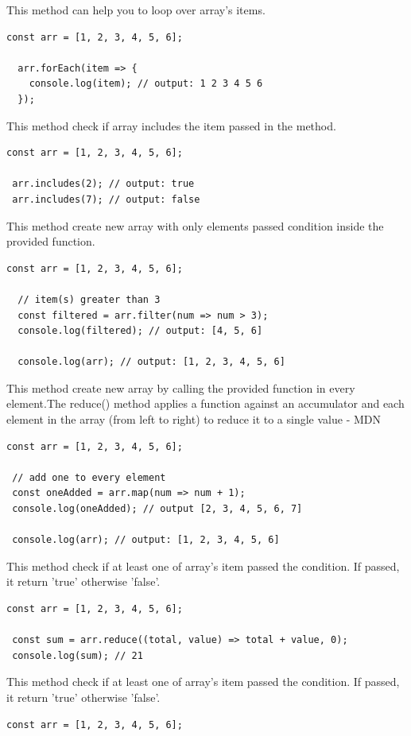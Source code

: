 \documentclass[10pt, a4paper, twocolumn]{article}
\begin{document}
\begin{description}[align=left]
\item [forEach()] This method can help you to loop over array's items.
\begin{lstlisting}
const arr = [1, 2, 3, 4, 5, 6];

  arr.forEach(item => {
    console.log(item); // output: 1 2 3 4 5 6
  });
\end{lstlisting}
\item [includes()] This method check if array includes the item passed in the method.
\begin{lstlisting}
const arr = [1, 2, 3, 4, 5, 6];

 arr.includes(2); // output: true
 arr.includes(7); // output: false
\end{lstlisting}
\item [filter()] This method create new array with only elements passed condition inside the provided function.
\begin{lstlisting}
const arr = [1, 2, 3, 4, 5, 6];

  // item(s) greater than 3
  const filtered = arr.filter(num => num > 3);
  console.log(filtered); // output: [4, 5, 6]

  console.log(arr); // output: [1, 2, 3, 4, 5, 6]
\end{lstlisting}
\item [map()] This method create new array by calling the provided function in every element.The reduce() method applies a function against an accumulator and each element in the array (from left to right) to reduce it to a single value - MDN
\begin{lstlisting}
const arr = [1, 2, 3, 4, 5, 6];

 // add one to every element
 const oneAdded = arr.map(num => num + 1);
 console.log(oneAdded); // output [2, 3, 4, 5, 6, 7]

 console.log(arr); // output: [1, 2, 3, 4, 5, 6]
\end{lstlisting}
\item [reduce()] This method check if at least one of array's item passed the condition. If passed, it return 'true' otherwise 'false'.
\begin{lstlisting}
const arr = [1, 2, 3, 4, 5, 6];

 const sum = arr.reduce((total, value) => total + value, 0);
 console.log(sum); // 21
\end{lstlisting}
\item [some()] This method check if at least one of array's item passed the condition. If passed, it return 'true' otherwise 'false'.
\begin{lstlisting}
const arr = [1, 2, 3, 4, 5, 6];


\end{lstlisting}
\end{description}
\end{document}
